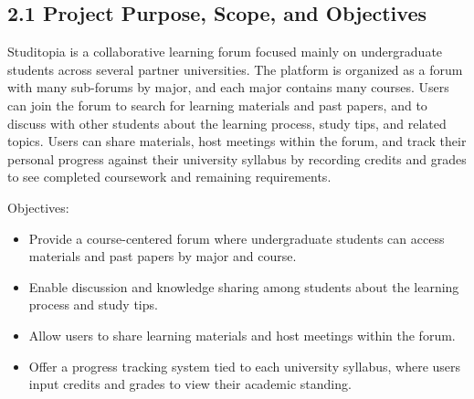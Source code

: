 \documentclass[12pt]{article}
\begin{document}
\subsection*{2.1 Project Purpose, Scope, and Objectives}
\par\medskip
Studitopia is a collaborative learning forum focused mainly on undergraduate students across several partner universities. The platform is organized as a forum with many sub-forums by major, and each major contains many courses. Users can join the forum to search for learning materials and past papers, and to discuss with other students about the learning process, study tips, and related topics. Users can share materials, host meetings within the forum, and track their personal progress against their university syllabus by recording credits and grades to see completed coursework and remaining requirements.
\par\medskip
Objectives:
\par\medskip
\begin{itemize}
\item Provide a course-centered forum where undergraduate students can access materials and past papers by major and course.
\par
\item Enable discussion and knowledge sharing among students about the learning process and study tips.
\par
\item Allow users to share learning materials and host meetings within the forum.
\par
\item Offer a progress tracking system tied to each university syllabus, where users input credits and grades to view their academic standing.
\par
\end{itemize}
\hypertarget{sec:22-assumptions-and-constraints}{}
\end{document}
